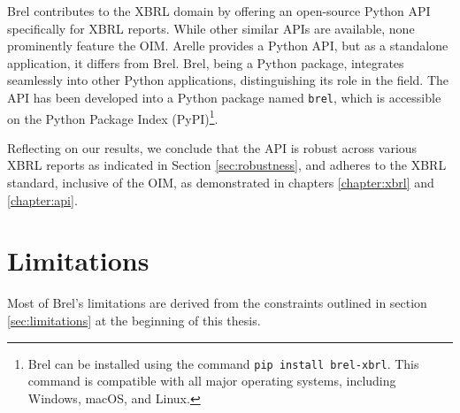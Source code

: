 Brel contributes to the XBRL domain by offering an open-source Python API specifically for XBRL reports.
While other similar APIs are available, none prominently feature the OIM.
Arelle provides a Python API, but as a standalone application, it differs from Brel.
Brel, being a Python package, integrates seamlessly into other Python applications, distinguishing its role in the field.
The API has been developed into a Python package named \texttt{brel},
which is accessible on the Python Package Index (PyPI)\footnote{Brel can be installed using the command \texttt{pip install brel-xbrl}. This command is compatible with all major operating systems, including Windows, macOS, and Linux.}.

Reflecting on our results, we conclude that the API is robust across various XBRL reports
as indicated in Section \ref{sec:robustness},
and adheres to the XBRL standard, inclusive of the OIM,
as demonstrated in chapters \ref{chapter:xbrl} and \ref{chapter:api}.

\section{Limitations}

Most of Brel's limitations are derived from the constraints outlined in section \ref{sec:limitations} at the beginning of this thesis.

